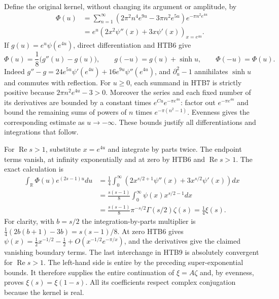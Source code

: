 \documentclass[11pt]{article}
\theoremstyle{definition}
\begin{document}
Define the original kernel, without changing its argument or amplitude,
by
\begin{equation}\tag{HTB7}
\begin{split}
 \Phi(u)
 &=\sum_{n=1}^{\infty}
   \left(2\pi^2n^4e^{9u}-3\pi n^2e^{5u}\right)
       e^{-\pi n^2e^{4u}}\\
 &=e^u\left(2x^2\psi''(x)+3x\psi'(x)\right)_{x=e^{4u}}.
\end{split}
\end{equation}
If $g(u)=e^u\psi(e^{4u})$, direct differentiation and HTB6 give
\begin{equation}\tag{HTB8}
 \Phi(u)=\frac18\bigl(g''(u)-g(u)\bigr),\qquad
 g(-u)=g(u)+\sinh u,\qquad \Phi(-u)=\Phi(u).
\end{equation}
Indeed $g''-g=24e^{5u}\psi'(e^{4u})+16e^{9u}\psi''(e^{4u})$,
and $\partial_u^2-1$ annihilates $\sinh u$ and commutes with reflection.
For $u\ge0$, each summand in HTB7 is strictly positive because
$2\pi n^2 e^{4u}-3>0$. Moreover the series and each fixed number of its
derivatives are bounded by a constant times $e^{C u}e^{-\pi e^{4u}}$:
factor out $e^{-\pi e^{4u}}$ and bound the remaining sums of powers of
$n$ times $e^{-\pi(n^2-1)}$. Evenness gives the corresponding estimate
as $u\to-\infty$. These bounds justify all differentiations and
integrations that follow.

For $\operatorname{Re}s>1$, substitute $x=e^{4u}$ and integrate by parts
twice. The endpoint terms vanish, at infinity exponentially and at zero
by HTB6 and $\operatorname{Re}s>1$. The exact calculation is
\begin{equation}\tag{HTB9}
\begin{split}
 \int_{\mathbb R}\Phi(u)e^{(2s-1)u}du
 &=\frac14\int_0^{\infty}
       \left(2x^{s/2+1}\psi''(x)+3x^{s/2}\psi'(x)\right)dx\\
 &=\frac{s(s-1)}8\int_0^{\infty}\psi(x)x^{s/2-1}dx\\
 &=\frac{s(s-1)}8\pi^{-s/2}\Gamma(s/2)\zeta(s)
 =\frac14\xi(s).
\end{split}
\end{equation}
For clarity, with $b=s/2$ the integration-by-parts multiplier is
$\frac14(2b(b+1)-3b)=s(s-1)/8$. At zero HTB6 gives
$\psi(x)=\frac12x^{-1/2}-\frac12+O(x^{-1/2}e^{-\pi/x})$, and the
derivatives give the claimed vanishing boundary terms. The last
interchange in HTB9 is absolutely convergent for $\operatorname{Re}s>1$.
The left-hand side is entire by the preceding super-exponential bounds.
It therefore supplies the entire continuation of $\xi=A\zeta$ and,
by evenness, proves $\xi(s)=\xi(1-s)$. All its coefficients respect
complex conjugation because the kernel is real.
\end{document}
